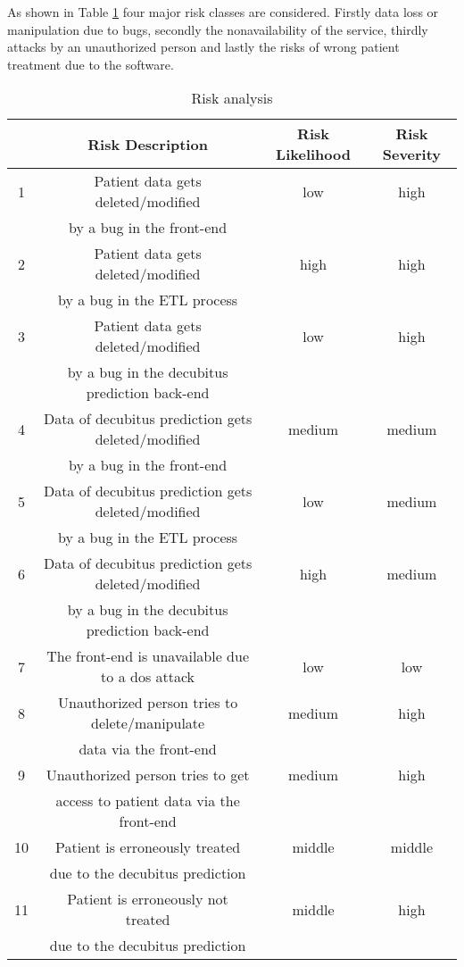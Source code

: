 As shown in Table \ref{risks} four major risk classes are considered. 
Firstly data loss or manipulation due to bugs, secondly the nonavailability of the service, thirdly attacks by an unauthorized person and lastly the risks of wrong patient treatment due to the software.

\begin{table}[htbp]
\begin{tabular}{|c|c|c|c|}
	\hline
	 &\textbf{ Risk Description} & \textbf{Risk Likelihood} & \textbf{Risk Severity}\\
	\hline
    \hline
	1 & Patient data gets deleted/modified & low & high \\
	& by a bug in the front-end &&\\
	\hline
	2 & Patient data gets deleted/modified & high & high \\
	& by a bug in the ETL process &&\\
	\hline
	3 & Patient data gets deleted/modified & low & high \\
	& by a bug in the decubitus prediction back-end &&\\
	\hline
	4 & Data of decubitus prediction gets deleted/modified & medium & medium \\
	& by a bug in the front-end &&\\
	\hline
	5 & Data of decubitus prediction gets deleted/modified & low & medium \\
	& by a bug in the ETL process &&\\
	\hline
	6 & Data of decubitus prediction gets deleted/modified & high & medium \\
	& by a bug in the decubitus prediction back-end &&\\
	\hline
	\hline
	7 & The front-end is unavailable due to a dos attack & low & low \\
	\hline
	\hline
	8 & Unauthorized person tries to delete/manipulate & medium & high \\
	& data via the front-end & & \\
	\hline
	9 & Unauthorized person tries to get & medium & high \\
	& access to patient data via the front-end & & \\
	\hline
	\hline
	10 & Patient is erroneously treated & middle & middle \\
	& due to the decubitus prediction && \\
	\hline
    11 & Patient is erroneously not treated  & middle & high \\
	& due to the decubitus prediction && \\
	\hline
\end{tabular}
\caption{Risk analysis}
\label{risks}
\end{table}

